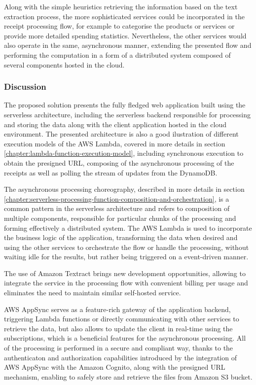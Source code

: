 Along with the simple heuristics retrieving the information based on the text extraction process, the more sophisticated services could be incorporated in the receipt processing flow, for example to categorise the products or services or provide more detailed spending statistics. Nevertheless, the other services would also operate in the same, asynchronous manner, extending the presented flow and performing the computation in a form of a distributed system composed of several components hosted in the cloud.

\subsubsection{Discussion}

The proposed solution presents the fully fledged web application built using the serverless architecture, including the serverless backend responsible for processing and storing the data along with the client application hosted in the cloud environment. 
The presented architecture is also a good ilustration of different execution models of the AWS Lambda, covered in more details in section \ref{chapter:lambda-function-execution-model}, including synchronous execution to obtain the presigned URL, composing of the asynchronous processing of the receipts as well as polling the stream of updates from the DynamoDB.

The asynchronous processing choreography, described in more details in section \ref{chapter:serverless-processing-function-composition-and-orchestration}, is a common pattern in the serverless architecture and refers to composition of multiple components, responsible for particular chunks of the processing and forming effectively a distributed system.
The AWS Lambda is used to incorporate the business logic of the application, transforming the data when desired and using the other services to orchestrate the flow or handle the processing, without waiting idle for the results, but rather being triggered on a event-driven manner.

The use of Amazon Textract brings new development opportunities, allowing to integrate the service in the processing flow with convenient billing per usage and eliminates the need to maintain similar self-hosted service.

AWS AppSync serves as a feature-rich gateway of the application backend, triggering Lambda functions or directly communicating with other services to retrieve the data, but also allows to update the client in real-time using the subscriptions, which is a beneficial features for the asynchronous processing.
All of the processing is performed in a secure and compliant way, thanks to the authenticaton and authorization capabilities introduced by the integration of AWS AppSync with the Amazon Cognito, along with the presigned URL mechanism, enabling to safely store and retrieve the files from Amazon S3 bucket.


